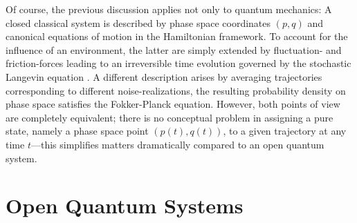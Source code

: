 Of course, the previous discussion applies not only to quantum mechanics:
A closed classical system is described by phase space coordinates $(p,q)$ and canonical equations of motion in the Hamiltonian framework.
To account for the influence of an environment, the latter are simply extended by fluctuation- and friction-forces leading to an irreversible time evolution governed by the stochastic Langevin equation \cite{GaCr85_handbook}.
A different description arises by averaging trajectories corresponding to different noise-realizations, the resulting probability density on phase space satisfies the Fokker-Planck equation.
However, both points of view are completely equivalent; there is no conceptual problem in assigning a pure state, namely a phase space point $(p(t),q(t))$, to a given trajectory at any time $t$---this simplifies matters dramatically compared to an open quantum system.

\section{Open Quantum Systems}
\label{sec:intro.open_quantum}


